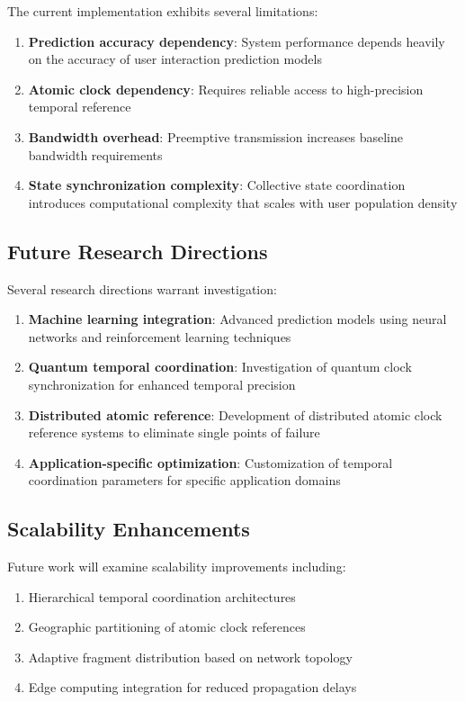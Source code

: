 \documentclass[12pt,a4paper]{article}
\begin{document}
The current implementation exhibits several limitations:

\begin{enumerate}
\item \textbf{Prediction accuracy dependency}: System performance depends heavily on the accuracy of user interaction prediction models
\item \textbf{Atomic clock dependency}: Requires reliable access to high-precision temporal reference
\item \textbf{Bandwidth overhead}: Preemptive transmission increases baseline bandwidth requirements
\item \textbf{State synchronization complexity}: Collective state coordination introduces computational complexity that scales with user population density
\end{enumerate}

\subsection{Future Research Directions}

Several research directions warrant investigation:

\begin{enumerate}
\item \textbf{Machine learning integration}: Advanced prediction models using neural networks and reinforcement learning techniques
\item \textbf{Quantum temporal coordination}: Investigation of quantum clock synchronization for enhanced temporal precision
\item \textbf{Distributed atomic reference}: Development of distributed atomic clock reference systems to eliminate single points of failure
\item \textbf{Application-specific optimization}: Customization of temporal coordination parameters for specific application domains
\end{enumerate}

\subsection{Scalability Enhancements}

Future work will examine scalability improvements including:

\begin{enumerate}
\item Hierarchical temporal coordination architectures
\item Geographic partitioning of atomic clock references  
\item Adaptive fragment distribution based on network topology
\item Edge computing integration for reduced propagation delays
\end{enumerate}
\end{document}
